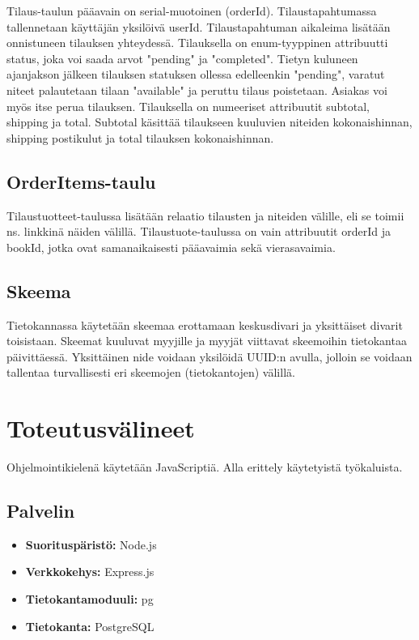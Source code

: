 \documentclass[11pt,a4paper]{article}
\begin{document}
Tilaus-taulun pääavain on serial-muotoinen (orderId). Tilaustapahtumassa tallennetaan käyttäjän yksilöivä userId. Tilaustapahtuman aikaleima lisätään onnistuneen tilauksen yhteydessä. Tilauksella on enum-tyyppinen attribuutti status, joka voi saada arvot "pending" ja "completed". Tietyn kuluneen ajanjakson jälkeen tilauksen statuksen ollessa edelleenkin "pending", varatut niteet palautetaan tilaan "available" ja peruttu tilaus poistetaan. Asiakas voi myös itse perua tilauksen. Tilauksella on numeeriset attribuutit subtotal, shipping ja total. Subtotal käsittää tilaukseen kuuluvien niteiden kokonaishinnan, shipping postikulut ja total tilauksen kokonaishinnan.

\subsection{OrderItems-taulu}

Tilaustuotteet-taulussa lisätään relaatio tilausten ja niteiden välille, eli se toimii ns. linkkinä näiden välillä. Tilaustuote-taulussa on vain attribuutit orderId ja bookId, jotka ovat samanaikaisesti pääavaimia sekä vierasavaimia.

\subsection{Skeema}

Tietokannassa käytetään skeemaa erottamaan keskusdivari ja yksittäiset divarit toisistaan. Skeemat kuuluvat myyjille ja myyjät viittavat skeemoihin tietokantaa päivittäessä. Yksittäinen nide voidaan yksilöidä UUID:n avulla, jolloin se voidaan tallentaa turvallisesti eri skeemojen (tietokantojen) välillä.

\section{Toteutusvälineet}

Ohjelmointikielenä käytetään JavaScriptiä. Alla erittely käytetyistä työkaluista.

\subsection{Palvelin}

\begin{itemize}
	\item \textbf{Suorituspäristö:} Node.js
	\item \textbf{Verkkokehys:} Express.js
	\item \textbf{Tietokantamoduuli:} pg
	\item \textbf{Tietokanta:} PostgreSQL
\end{itemize}
\end{document}
